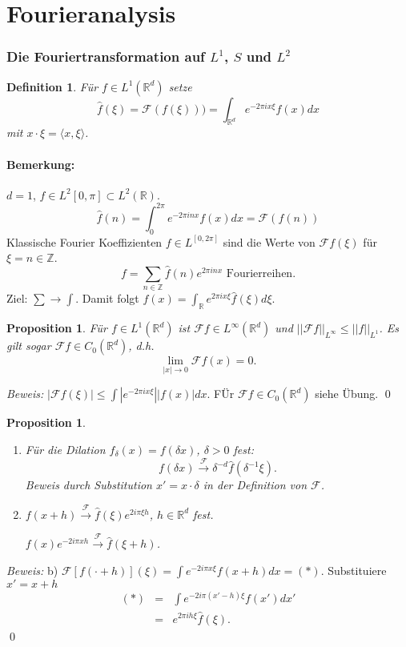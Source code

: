 \documentclass[12pt]{extreport} %
\newtheorem{Definition}[Satz]{Definition}
\newtheorem{Prop}[Satz]{Proposition}
\numberwithin{equation}{section}
\newcommand{\R}{\mathbb{R}} %
\newcommand{\Z}{\mathbb{Z}} %
\newcommand{\f}{\hat{f}}
\newcommand{\F}{\mathcal{F}}
\newcommand{\m}{\cdot}
\newcommand{\Bew}{\emph{Beweis: }}
\begin{document}
	\newpage
	\section{Fourieranalysis}
	
	\subsubsection{Die Fouriertransformation auf $L^1$, $S$ und $L^2$}
	
	\begin{Definition}
		Für $f\in L^1(\R^d)$ setze 
		$$\f(\xi) = \F(f(\xi))) = \int_{\R^d} e^{-2\pi ix\xi}f(x)dx$$
		mit $x\m \xi = \langle x,\xi\rangle$.
	\end{Definition}
	
	\paragraph{Bemerkung:} $d = 1$, $f\in L^2[0,\pi]\subset L^2(\R)$.
	$$\f(n) = \int_{0}^{2\pi} e^{-2\pi i n x}f(x) dx = \F(f(n))$$
	Klassische Fourier Koeffizienten $f\in L^[0,2\pi]$ sind die Werte von $\F f(\xi)$ für $\xi = n\in \Z$.
	$$f= \sum_{n \in \Z} \f(n) e^{2\pi i n x} \text{ Fourierreihen.}$$
	Ziel: $\sum\rightarrow \int$. Damit folgt $f(x) = \int_{\R}e^{2\pi i x \xi}\f(\xi)d\xi$.
	
	\begin{Prop}
		Für $f\in L^1(\R^d)$ ist $\F f\in L^{\infty}(\R^d)$ und $||\F f||_{L^\infty}\leq ||f||_{L^1}$. Es gilt sogar $\F f\in C_0(\R^d)$, d.h. 
		$$\lim\limits_{|x|\rightarrow 0}\F f(x) = 0.$$
	\end{Prop}
	
	\Bew $|\F f(\xi)|\leq \int |e^{-2\pi i x\xi}| |f(x)| dx$. FÜr $\F f\in C_0(\R^d)$ siehe Übung.
	\qed
	
	\begin{Prop}
		~
		\begin{enumerate}
			\item[a)] Für die Dilation $f_\delta(x) = f(\delta x)$, $\delta>0$ fest:
			$$f(\delta x) \overset{\F}{\rightarrow} \delta^{-d}\f(\delta^{-1}\xi).$$
			Beweis durch Substitution $x' = x\m \delta$ in der Definition von $\F$.
			\item[b)] $f(x+h) \overset{\F}{\rightarrow} \f(\xi)e^{2i\pi \xi h}$, $h\in \R^d$ fest. 
			
			$f(x)e^{-2i\pi x h}\overset{\F}{\rightarrow} \f(\xi+h)$. 
		\end{enumerate}
	\end{Prop}
	\Bew b) $\F[f(\m+h)](\xi) = \int e^{-2i\pi x\xi}f(x+h) dx = (*)$. Substituiere $x' = x+h$
	\begin{eqnarray}
		(*) &=& \int e^{-2i\pi (x'-h)\xi}f(x')dx'\nonumber\\
		&=& e^{2\pi i h\xi}\f(\xi).\nonumber
	\end{eqnarray}
	\qed
	
\end{document}
